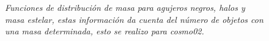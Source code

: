 \begin{figure}
\centering
{}
\caption{\emph{Funciones de distribución de masa para agujeros negros, halos y masa estelar, estas información da cuenta del número de objetos con una masa determinada, esto se realizo para {\it{cosmo02}}.}}
 \label{fig: Funciones de masa cosmo02}
\end{figure}

